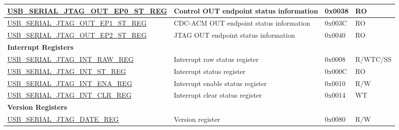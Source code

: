 \begin{longtable}{ | p{6cm} | p{7.2cm} | p{1.3cm} | p{1cm} | }
\hyperref[regdesc:USBSERIALJTAGOUTEP0STREG]{USB\_SERIAL\_JTAG\_OUT\_EP0\_ST\_REG} & Control OUT endpoint status information & 0x0038 & RO \\ \hline
\hyperref[regdesc:USBSERIALJTAGOUTEP1STREG]{USB\_SERIAL\_JTAG\_OUT\_EP1\_ST\_REG} & CDC-ACM OUT endpoint status information & 0x003C & RO \\ \hline
\hyperref[regdesc:USBSERIALJTAGOUTEP2STREG]{USB\_SERIAL\_JTAG\_OUT\_EP2\_ST\_REG} & JTAG OUT endpoint status information & 0x0040 & RO \\ \hline
\multicolumn{4}{|l|}{\textbf{Interrupt Registers}} \\ \hline
\hyperref[regdesc:USBSERIALJTAGINTRAWREG]{USB\_SERIAL\_JTAG\_INT\_RAW\_REG} & Interrupt raw status register & 0x0008 & R/WTC/SS \\ \hline
\hyperref[regdesc:USBSERIALJTAGINTSTREG]{USB\_SERIAL\_JTAG\_INT\_ST\_REG} & Interrupt status register & 0x000C & RO \\ \hline
\hyperref[regdesc:USBSERIALJTAGINTENAREG]{USB\_SERIAL\_JTAG\_INT\_ENA\_REG} & Interrupt enable status register & 0x0010 & R/W \\ \hline
\hyperref[regdesc:USBSERIALJTAGINTCLRREG]{USB\_SERIAL\_JTAG\_INT\_CLR\_REG} & Interrupt clear status register & 0x0014 & WT \\ \hline
\multicolumn{4}{|l|}{\textbf{Version Registers}} \\ \hline
\hyperref[regdesc:USBSERIALJTAGDATEREG]{USB\_SERIAL\_JTAG\_DATE\_REG} & Version register & 0x0080 & R/W \\ \hline
\end{longtable}
